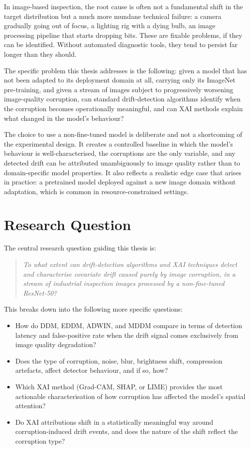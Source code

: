 In image-based inspection, the root cause is often not a fundamental shift in the target distribution but a much more mundane technical failure: a camera gradually going out of focus, a lighting rig with a dying bulb, an image processing pipeline that starts dropping bits. These are fixable problems, if they can be identified. Without automated diagnostic tools, they tend to persist far longer than they should.

The specific problem this thesis addresses is the following: given a model that has not been adapted to its deployment domain at all, carrying only its ImageNet pre-training, and given a stream of images subject to progressively worsening image-quality corruption, can standard drift-detection algorithms identify when the corruption becomes operationally meaningful, and can XAI methods explain what changed in the model's behaviour?

The choice to use a non-fine-tuned model is deliberate and not a shortcoming of the experimental design. It creates a controlled baseline in which the model's behaviour is well-characterised, the corruptions are the only variable, and any detected drift can be attributed unambiguously to image quality rather than to domain-specific model properties. It also reflects a realistic edge case that arises in practice: a pretrained model deployed against a new image domain without adaptation, which is common in resource-constrained settings.

\section{Research Question}%
\label{sec:onderzoeksvraag}

The central research question guiding this thesis is:

\begin{quote}
\textit{To what extent can drift-detection algorithms and XAI techniques detect and characterise covariate drift caused purely by image corruption, in a stream of industrial inspection images processed by a non-fine-tuned ResNet-50?}
\end{quote}

This breaks down into the following more specific questions:

\begin{itemize}
  \item How do DDM, EDDM, ADWIN, and MDDM compare in terms of detection latency and false-positive rate when the drift signal comes exclusively from image quality degradation?
  \item Does the type of corruption, noise, blur, brightness shift, compression artefacts, affect detector behaviour, and if so, how?
  \item Which XAI method (Grad-CAM, SHAP, or LIME) provides the most actionable characterisation of how corruption has affected the model's spatial attention?
  \item Do XAI attributions shift in a statistically meaningful way around corruption-induced drift events, and does the nature of the shift reflect the corruption type?
\end{itemize}

